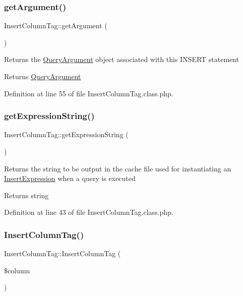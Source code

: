 \subsubsection{\texorpdfstring{get\+Argument()}{getArgument()}}
{\footnotesize\ttfamily Insert\+Column\+Tag\+::get\+Argument (\begin{DoxyParamCaption}{ }\end{DoxyParamCaption})}

Returns the \hyperlink{classQueryArgument}{Query\+Argument} object associated with this I\+N\+S\+E\+RT statement

\begin{DoxyReturn}{Returns}
\hyperlink{classQueryArgument}{Query\+Argument} 
\end{DoxyReturn}


Definition at line 55 of file Insert\+Column\+Tag.\+class.\+php.

\hypertarget{classInsertColumnTag_a77e3aba891447e4d9fddc8a91c6ca9da}{}\label{classInsertColumnTag_a77e3aba891447e4d9fddc8a91c6ca9da} 
\subsubsection{\texorpdfstring{get\+Expression\+String()}{getExpressionString()}}
{\footnotesize\ttfamily Insert\+Column\+Tag\+::get\+Expression\+String (\begin{DoxyParamCaption}{ }\end{DoxyParamCaption})}

Returns the string to be output in the cache file used for instantiating an \hyperlink{classInsertExpression}{Insert\+Expression} when a query is executed

\begin{DoxyReturn}{Returns}
string 
\end{DoxyReturn}


Definition at line 43 of file Insert\+Column\+Tag.\+class.\+php.

\hypertarget{classInsertColumnTag_a7ca1654435b7a6e73d269f9e4f50e119}{}\label{classInsertColumnTag_a7ca1654435b7a6e73d269f9e4f50e119} 
\subsubsection{\texorpdfstring{Insert\+Column\+Tag()}{InsertColumnTag()}}
{\footnotesize\ttfamily Insert\+Column\+Tag\+::\+Insert\+Column\+Tag (\begin{DoxyParamCaption}\item[{}]{\$column }\end{DoxyParamCaption})}

